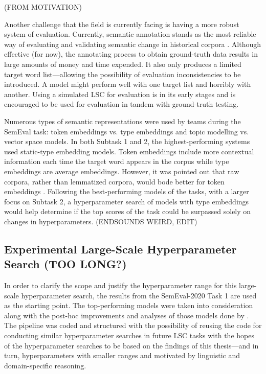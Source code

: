 (FROM MOTIVATION)

Another challenge that the field is currently facing is having a more robust system of evaluation. Currently, semantic annotation stands as the most reliable way of evaluating and validating semantic change in historical corpora \citep{hengchen2021challenges}. Although effective (for now), the annotating process to obtain ground-truth data results in large amounts of money and time expended. It also only produces a limited target word list—allowing the possibility of evaluation inconsistencies to be introduced. A model might perform well with one target list and horribly with another. Using a simulated LSC for evaluation is in its early stages and is encouraged to be used for evaluation in tandem with ground-truth testing.

Numerous types of semantic representations were used by teams during the SemEval task: token embeddings vs. type embeddings and topic modelling vs. vector space models. In both Subtask 1 and 2, the highest-performing systems used static-type embedding models. Token embeddings include more contextual information each time the target word appears in the corpus while type embeddings are average embeddings. However, it was pointed out that raw corpora, rather than lemmatized corpora, would bode better for token embeddings \citep{schlechtweg-etal-2020-semeval}. Following the best-performing models of the tasks, with a larger focus on Subtask 2, a hyperparameter search of models with type embeddings would help determine if the top scores of the task could be surpassed solely on changes in hyperparameters. (ENDSOUNDS WEIRD, EDIT) 

\subsection{Experimental Large-Scale Hyperparameter Search (TOO LONG?)}

In order to clarify the scope and justify the hyperparameter range for this large-scale hyperparameter search, the results from the SemEval-2020 Task 1 are used as the starting point. The top-performing models were taken into consideration along with the post-hoc improvements and analyses of those models done by \citet{kaiser-etal-2020-ims}. The pipeline was coded and structured with the possibility of reusing the code for conducting similar hyperparameter searches in future LSC tasks with the hopes of the hyperparameter searches to be based on the findings of this thesis—and in turn, hyperparameters with smaller ranges and motivated by linguistic and domain-specific reasoning. 

